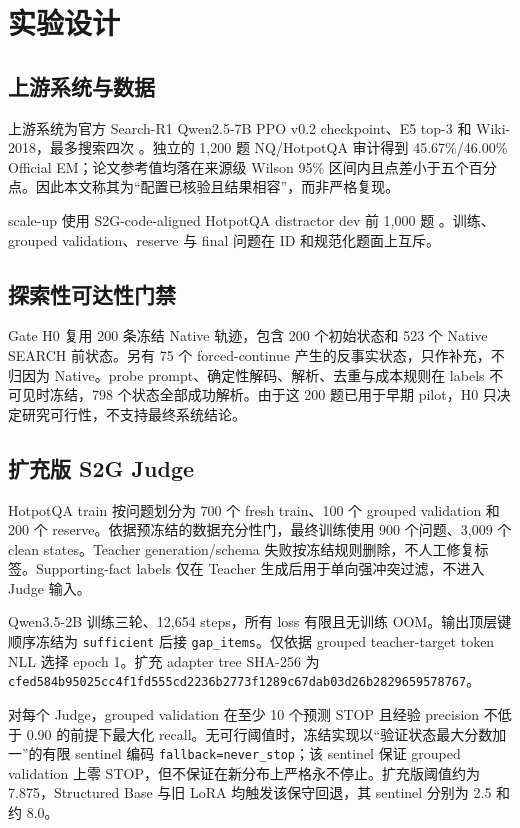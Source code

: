 \documentclass[UTF8,fontset=fandol,11pt,a4paper]{ctexart}
\newcommand{\model}[1]{\texttt{#1}}
\begin{document}
\section{实验设计}

\subsection{上游系统与数据}

上游系统为官方 Search-R1 Qwen2.5-7B PPO v0.2 checkpoint、E5 top-3 和 Wiki-2018，最多搜索四次 \citep{jin2025searchr1}。独立的 1,200 题 NQ/HotpotQA 审计得到 45.67\%/46.00\% Official EM；论文参考值均落在来源级 Wilson 95\% 区间内且点差小于五个百分点。因此本文称其为“配置已核验且结果相容”，而非严格复现。

scale-up 使用 S2G-code-aligned HotpotQA distractor dev 前 1,000 题 \citep{yang2018hotpotqa}。训练、grouped validation、reserve 与 final 问题在 ID 和规范化题面上互斥。

\subsection{探索性可达性门禁}

Gate H0 复用 200 条冻结 Native 轨迹，包含 200 个初始状态和 523 个 Native SEARCH 前状态。另有 75 个 forced-continue 产生的反事实状态，只作补充，不归因为 Native。probe prompt、确定性解码、解析、去重与成本规则在 labels 不可见时冻结，798 个状态全部成功解析。由于这 200 题已用于早期 pilot，H0 只决定研究可行性，不支持最终系统结论。

\subsection{扩充版 S2G Judge}

HotpotQA train 按问题划分为 700 个 fresh train、100 个 grouped validation 和 200 个 reserve。依据预冻结的数据充分性门，最终训练使用 900 个问题、3,009 个 clean states。Teacher generation/schema 失败按冻结规则删除，不人工修复标签。Supporting-fact labels 仅在 Teacher 生成后用于单向强冲突过滤，不进入 Judge 输入。

Qwen3.5-2B 训练三轮、12,654 steps，所有 loss 有限且无训练 OOM。输出顶层键顺序冻结为 \model{sufficient} 后接 \model{gap\_items}。仅依据 grouped teacher-target token NLL 选择 epoch 1。扩充 adapter tree SHA-256 为 \nolinkurl{cfed584b95025cc4f1fd555cd2236b2773f1289c67dab03d26b2829659578767}。

对每个 Judge，grouped validation 在至少 10 个预测 STOP 且经验 precision 不低于 0.90 的前提下最大化 recall。无可行阈值时，冻结实现以“验证状态最大分数加一”的有限 sentinel 编码 \model{fallback=never\_stop}；该 sentinel 保证 grouped validation 上零 STOP，但不保证在新分布上严格永不停止。扩充版阈值约为 7.875，Structured Base 与旧 LoRA 均触发该保守回退，其 sentinel 分别为 2.5 和约 8.0。
\end{document}
